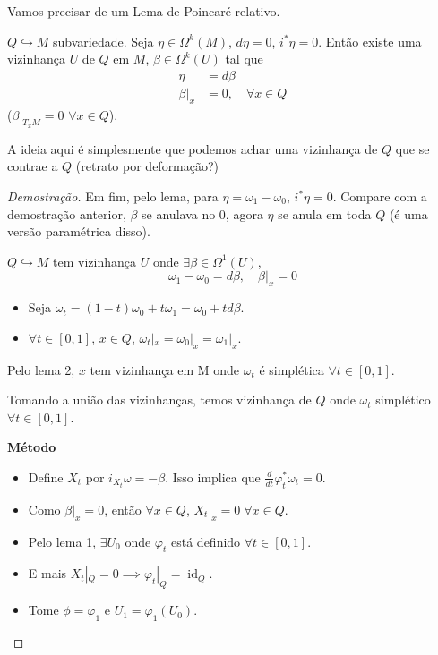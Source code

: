 	Vamos precisar de um Lema de Poincar\'e relativo.

	\begin{lemma}
		$Q\hookrightarrow M$ subvariedade. Seja $\eta \in\Omega^{k}(M)$, $d\eta=0$,  $i^*\eta=0$. Ent\~ao existe uma vizinhança $U$ de $Q$ em $M$, $\beta\in\Omega^{k}(U)$ tal que
		\begin{align*}
			\eta & =d\beta\\
			\beta|_{x}&=0,\quad \forall x\in Q
		\end{align*}
		($\beta|_{T_xM}=0$ $\forall x\in Q$).

		A ideia aqui \'e simplesmente que podemos achar uma vizinhança de $Q$  que se contrae a $Q$ (retrato por deforma\c c\~ao?)
	\end{lemma}

\begin{proof}[Demostra\c c\~ao]
	Em fim, pelo lema, para $\eta=\omega_1-\omega_0$, $i^*\eta=0$. Compare com a demostra\c c\~ao anterior, $\beta$ se anulava no 0, agora $\eta$ se anula em toda $Q$ (\'e uma vers\~ao param\'etrica disso).

	$Q\hookrightarrow M$ tem vizinhança $U$ onde $\exists \beta\in\Omega^{1}(U)$,
	\[\omega_1-\omega_0=d\beta,\quad \beta |_{x}=0\]
	\begin{itemize}
		\item Seja $\omega_t=(1-t)\omega_0+t\omega_1=\omega_0+t d\beta$.
		\item $\forall t\in [0,1]$, $x\in Q$, $\omega_ t |_{x}=\omega_0|_{x}=\omega_1|_{x}$.
	\end{itemize}
	Pelo lema 2, $x$ tem vizinhança em M onde $\omega_t$ \'e simpl\'etica $\forall t\in [0,1]$.

	Tomando a uni\~ao das vizinhanças, temos vizinhança de $Q$ onde $\omega_t$ simpl\'etico $\forall t\in[0,1]$.

	\textbf{M\'etodo}
	\begin{itemize}
		\item Define $X_t$ por $i_{X_t}\omega=-\beta$. Isso implica que $\frac{d}{dt}\varphi^*_t\omega_t=0$.

		\item Como $\beta|_{x}=0$, ent\~ao $\forall x\in Q$, $X_t |_{x}=0\;\forall x\in Q$.

		\item Pelo lema 1, $\exists U_0$ onde $\varphi_t$ est\'a definido $\forall t\in [0,1]$.

		\item E mais $X_t |_{Q}=0\implies \varphi_t |_{Q}=\operatorname{id}_Q$.

		\item Tome $\phi=\varphi_1$ e $U_1=\varphi_1(U_0)$.
	\end{itemize}
\end{proof}

